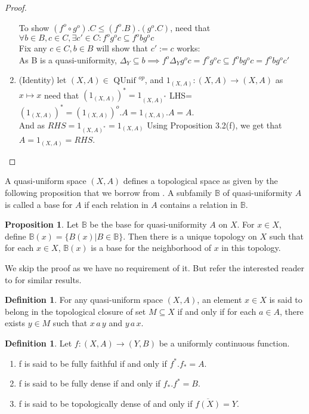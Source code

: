 \documentclass[a4paper]{article}
\theoremstyle{definition}
\newtheorem{definition}[theorem]{Definition}
\newtheorem{prop}[theorem]{Proposition}
\begin{document}
\begin{proof}
\begin{enumerate}[label=(\roman*)]
						To show $(f^o \circ g^o).C\leq(f^o .B).(g^o .C)$, need that
						$\forall b \in B, c \in C, \exists c' \in C: f^o g^o c \subseteq f^obg^oc $
						\\Fix any $c\in C, b\in B$ will show that $c':=c$ works:\\
						As B is a quasi-uniformity, $\Delta_Y \subseteq b\implies f^o \Delta_Y
						g^o c=f^o g^o c \subseteq f^o b	g^o c=f^o b g^o c'$
					\item(Identity) let $(X,A)\in \text{ QUnif }^{op} $, and
						$1_{(X,A)}:(X,A)\to(X,A)$ as $x\mapsto x$ need that
						$(1_{(X,A)})^*=1_{(X,A)^*}$
						LHS=$(1_{(X,A)})^*=(1_{(X,A)})^o.A=1_{(X,A)}.A=A$. \\
						And as $RHS=1_{(X,A)^*}=1_{(X,A)}$
						Using Proposition 3.2(f), we get that $A=1_{(X,A)}=RHS$. \qedhere
				\end{enumerate}
			\end{proof}

			A quasi-uniform space $(X,A)$ defines a topological space as given by the
			following proposition that we borrow from \cite{Fletcher_Lindgren_1982}.
		A subfamily $\mathbb{B}$ of quasi-uniformity $A$ is called a base for $A$
		if each relation in $A$ contains a relation in $\mathbb{B}$.
			\begin{prop}
				Let $\mathbb{B}$ be the base for quasi-uniformity $A$ on $X$.
				For $x \in X$, define $\mathbb{B}(x)=\{B(x) | B \in \mathbb{B}\}$.
				Then there is a unique topology on $X$ such that for each $x\in X$,
				$\mathbb{B}(x)$ is a base for the neighborhood of $x$ in this topology.
			\end{prop}
			We skip the proof as we have no requirement of it. But refer the interested reader to
\cite{Fletcher_Lindgren_1982} for similar results.

			\begin{definition} %
				For any quasi-uniform space $(X,A)$, an element $x \in X$ is said to belong in the
				topological closure of set $M\subseteq X$ if and only if for each $a\in A$,
				there exists $y\in M$ such that $x\, a\, y$ and $y\, a\, x$.
			\end{definition}

			\begin{definition} %
				Let $f:(X,A) \to (Y,B)$ be a uniformly continuous function.
				\begin{enumerate}[label=\Roman*]
					\item f is said to be fully faithful if and only if $f^* .f_*=A$.
					\item f is said to be fully dense if and only if $f_* .f^*=B $.
					\item f is said to be topologically dense of and only if $\overline{f(X)}=Y$.
				\end{enumerate}
			\end{definition}
\end{document}
